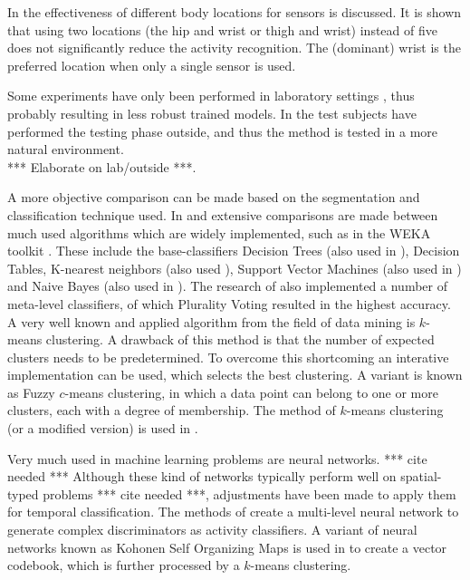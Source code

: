 In \cite{bao2004activity} the effectiveness of different body locations for sensors is discussed.
It is shown that using two locations (the hip and wrist or thigh and wrist) instead of five does not significantly reduce the activity recognition.
The (dominant) wrist is the preferred location when only a single sensor is used.

Some experiments have only been performed in laboratory settings \cite{yang2008using}, thus probably resulting in less robust trained models.
In \cite{siirtola2012recognizing} the test subjects have performed the testing phase outside, and thus the method is tested in a more natural environment.
\\ *** Elaborate on lab/outside ***.

A more objective comparison can be made based on the segmentation and classification technique used.
In \cite{bao2004activity} and \cite{ravi2005activity} extensive comparisons are made between much used algorithms which are widely implemented, such as in the WEKA toolkit \cite{hall2009weka}.
These include the base-classifiers Decision Trees (also used in \cite{kwapisz2011activity,duque2012offline}), Decision Tables, K-nearest neighbors (also used \cite{duque2012offline, siirtola2012recognizing}), Support Vector Machines (also used in \cite{derawi2010accelerometer,he2009activity, he2008activity}) and Naive Bayes (also used in \cite{long2009single}).
The research of \cite{bao2004activity} also implemented a number of meta-level classifiers, of which Plurality Voting resulted in the highest accuracy.
A very well known and applied algorithm from the field of data mining is $k$-means clustering.
A drawback of this method is that the number of expected clusters needs to be predetermined.
To overcome this shortcoming an interative implementation can be used, which selects the best clustering.
A variant is known as Fuzzy $c$-means clustering, in which a data point can belong to one or more clusters, each with a degree of membership.
The method of $k$-means clustering (or a modified version) is used in \cite{krause2003unsupervised, zhou2008aligned, lee2178physical}.

Very much used in machine learning problems are neural networks. *** cite needed ***
Although these kind of networks typically perform well on spatial-typed problems *** cite needed ***, adjustments have been made to apply them for temporal classification.
The methods of \cite{yang2008using, kwapisz2011activity} create a multi-level neural network to generate complex discriminators as activity classifiers.
A variant of neural networks known as Kohonen Self Organizing Maps is used in \cite{krause2003unsupervised} to create a vector codebook, which is further processed by a $k$-means clustering.

